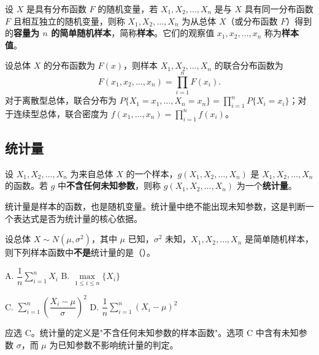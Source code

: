 \documentclass[lang=cn,11pt]{elegantbook}
\begin{document}
\begin{definition}[简单随机样本] \label{def:sample}
设 \(X\) 是具有分布函数 \(F\) 的随机变量，若 \(X_1, X_2, \dots, X_n\) 是与 \(X\) 具有同一分布函数 \(F\) 且相互独立的随机变量，则称 \(X_1, X_2, \dots, X_n\) 为从总体 \(X\)（或分布函数 \(F\)）得到的\textbf{容量为 \(n\) 的简单随机样本}，简称\textbf{样本}。它们的观察值 \(x_1, x_2, \dots, x_n\) 称为\textbf{样本值}。
\end{definition}

\begin{property}[样本的分布] \label{prop:sample-dist}
设总体 \(X\) 的分布函数为 \(F(x)\)，则样本 \(X_1, X_2, \dots, X_n\) 的联合分布函数为
\[
F(x_1, x_2, \dots, x_n) = \prod_{i=1}^{n} F(x_i).
\]
对于离散型总体，联合分布为 \(P\{X_1 = x_1, \dots, X_n = x_n\} = \prod_{i=1}^{n} P\{X_i = x_i\}\)；对于连续型总体，联合密度为 \(f(x_1, \dots, x_n) = \prod_{i=1}^{n} f(x_i)\)。
\end{property}


\subsection{统计量}

\begin{definition}[统计量] \label{def:statistic}
设 \(X_1, X_2, \dots, X_n\) 为来自总体 \(X\) 的一个样本，\(g(X_1, X_2, \dots, X_n)\) 是 \(X_1, X_2, \dots, X_n\) 的函数。若 \(g\) 中\textbf{不含任何未知参数}，则称 \(g(X_1, X_2, \dots, X_n)\) 为一个\textbf{统计量}。
\end{definition}

\begin{note}
统计量是样本的函数，也是随机变量。统计量中绝不能出现未知参数，这是判断一个表达式是否为统计量的核心依据。
\end{note}

\begin{exercise}[统计量的判定] \label{ex:statistic_01}
设总体 \(X \sim N(\mu,\sigma^2)\)，其中 \(\mu\) 已知，\(\sigma^2\) 未知，\(X_1,X_2,\dots,X_n\) 是简单随机样本，则下列样本函数中\textbf{不是}统计量的是（\quad）。\par
A. \(\dfrac{1}{n}\displaystyle\sum_{i=1}^{n}X_i\)\qquad
B. \(\max\limits_{1\leq i\leq n}\{X_i\}\)\par
C. \(\displaystyle\sum_{i=1}^{n}\!\left(\dfrac{X_i-\mu}{\sigma}\right)^{\!2}\)\qquad
D. \(\dfrac{1}{n}\displaystyle\sum_{i=1}^{n}(X_i-\mu)^2\)
\end{exercise}
\begin{solution}
应选 C。统计量的定义是"不含任何未知参数的样本函数"。选项 C 中含有未知参数 \(\sigma\)，而 \(\mu\) 为已知参数不影响统计量的判定。
\end{solution}
\end{document}

